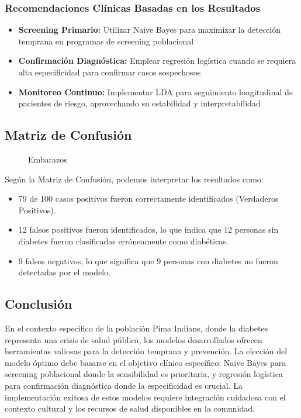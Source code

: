 \documentclass[12pt,a4paper]{article}
\begin{document}
\subsubsection{Recomendaciones Clínicas Basadas en los Resultados}

\begin{itemize}
\item \textbf{Screening Primario:} Utilizar Naive Bayes para maximizar la detección temprana en programas de screening poblacional
\item \textbf{Confirmación Diagnóstica:} Emplear regresión logística cuando se requiera alta especificidad para confirmar casos sospechosos
\item \textbf{Monitoreo Continuo:} Implementar LDA para seguimiento longitudinal de pacientes de riesgo, aprovechando su estabilidad y interpretabilidad
\end{itemize}

\subsection{Matriz de Confusión}

\begin{figure}[H]
    \centering
    \caption{\footnotesize Embarazos}
    \label{fig:matriz_confusion}
\end{figure}

Según la Matriz de Confusión, podemos interpretar los resultados como: 

\begin{itemize}
\item 79 de 100 casos positivos fueron correctamente identificados (Verdaderos Positivos).
\item 12 falsos positivos fueron identificados, lo que indica que 12 personas sin diabetes fueron clasificadas erróneamente como diabéticas.
\item 9 falsos negativos, lo que significa que 9 personas con diabetes no fueron detectadas por el modelo.
\end{itemize}

\subsection{Conclusión}

En el contexto específico de la población Pima Indians, donde la diabetes representa una crisis de salud pública, los modelos desarrollados ofrecen herramientas valiosas para la detección temprana y prevención. La elección del modelo óptimo debe basarse en el objetivo clínico específico: Naive Bayes para screening poblacional donde la sensibilidad es prioritaria, y regresión logística para confirmación diagnóstica donde la especificidad es crucial. La implementación exitosa de estos modelos requiere integración cuidadosa con el contexto cultural y los recursos de salud disponibles en la comunidad.
\end{document}
